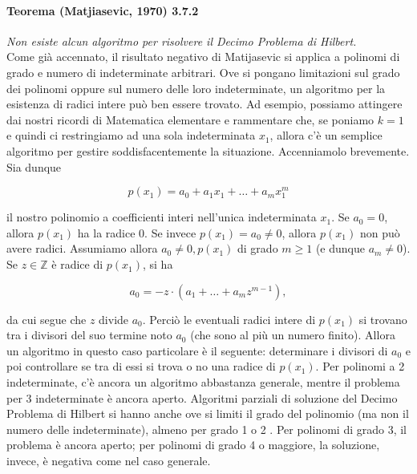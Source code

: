\paragraph{Teorema (Matjiasevic, 1970) 3.7.2} \textit{Non esiste alcun algoritmo per
    risolvere il Decimo Problema di Hilbert.}\\

Come già accennato, il risultato negativo di Matijasevic si applica a polinomi di
grado e numero di indeterminate arbitrari. Ove si pongano limitazioni sul grado dei
polinomi oppure sul numero delle loro indeterminate, un algoritmo per la esistenza di
radici intere può ben essere trovato. Ad esempio, possiamo attingere dai nostri
ricordi di Matematica elementare e rammentare che, se poniamo $k=1$ e quindi ci
restringiamo ad una sola indeterminata $x_1$, allora c'è un semplice algoritmo per
gestire soddisfacentemente la situazione. Accenniamolo brevemente.\\
Sia dunque

\[
    p\left(x_1\right)=a_0+a_1 x_1+\ldots+a_m x_1^m
\]

il nostro polinomio a coefficienti interi nell'unica indeterminata $x_1$. Se $a_0=0$,
allora $p\left(x_1\right)$ ha la radice 0. Se invece $p\left(x_1\right)=a_0 \neq 0$,
allora $p\left(x_1\right)$ non può avere radici. Assumiamo allora $a_0 \neq 0,
    p\left(x_1\right)$ di grado $m \geq 1$ (e dunque $a_m \neq 0$). Se $z \in
    \mathbb{Z}$ è radice di $p\left(x_1\right)$, si ha

\[
    a_0=-z \cdot\left(a_1+\ldots+a_m z^{m-1}\right),
\]

da cui segue che $z$ divide $a_0$. Perciò le eventuali radici intere di
$p\left(x_1\right)$ si trovano tra i divisori del suo termine noto $a_0$ (che sono al
più un numero finito). Allora un algoritmo in questo caso particolare è il seguente:
determinare i divisori di $a_0$ e poi controllare se tra di essi si trova o no
una radice di $p\left(x_1\right)$. Per polinomi a 2 indeterminate, c'è ancora un
algoritmo abbastanza generale, mentre il problema per 3 indeterminate è ancora
aperto. Algoritmi parziali di soluzione del Decimo Problema di Hilbert si hanno anche
ove si limiti il grado del polinomio (ma non il numero delle indeterminate), almeno
per grado 1 o 2 . Per polinomi di grado 3, il problema è ancora aperto; per polinomi
di grado 4 o maggiore, la soluzione, invece, è negativa come nel caso generale.